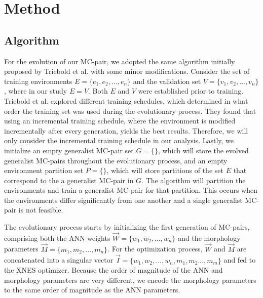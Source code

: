 
\section{Method}
    \subsection{Algorithm}
        For the evolution of our MC-pair, we adopted the same algorithm initially proposed by Triebold et al. \cite{Corinna_Triebold} with some minor modifications. Consider the set of training environments $E = \{e_1, e_2, \ldots, e_n\}$ and the validation set $V = \{v_1, v_2, \ldots, v_n\}$, where in our study $E = V$. Both $E$ and $V$ were established prior to training. Triebold et al. explored different training schedules, which determined in what order the training set was used during the evolutionary process. They found that using an incremental training schedule, where the environment is modified incrementally after every generation, yields the best results. Therefore, we will only consider the incremental training schedule in our analysis. Lastly, we initialize an empty generalist MC-pair set $G = \{\}$, which will store the evolved generalist MC-pairs throughout the evolutionary process, and an empty environment partition set $P = \{\}$, which will store partitions of the set $E$ that correspond to the a generalist MC-pair in $G$. The algorithm will partition the environments and train a generalist MC-pair for that partition. This occurs when the environments differ significantly from one another and a single generalist MC-pair is not feasible. 

        The evolutionary process starts by initializing the first generation of MC-pairs, comprising both the ANN weights $\overrightarrow{W} = \{w_1, w_2, \ldots, w_n\}$ and the morphology parameters $\overrightarrow{M} = \{m_1, m_2, \ldots, m_n\}$. For the optimization process, $\overrightarrow{W}$ and $\overrightarrow{M}$ are concatenated into a singular vector \newline $\overrightarrow{I} = \{w_1, w_2, \ldots, w_n, m_1, m_2 \ldots, m_m\}$ and fed to the XNES optimizer. Because the order of magnitude of the ANN and morphology parameters are very different, we encode the morphology parameters to the same order of magnitude as the ANN parameters.

